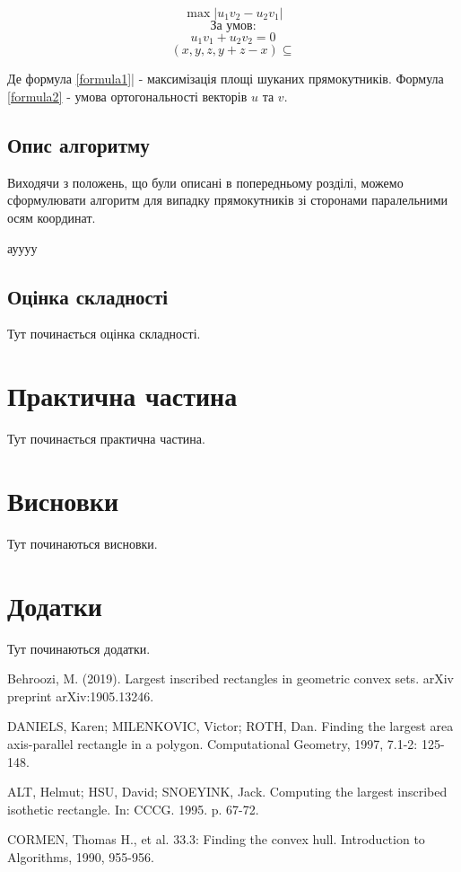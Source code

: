 \documentclass[a4paper,12pt]{article}
\begin{document}
	\begin{equation}
		\max \left| u_1 v_2 - u_2 v_1 \right|
		\label{formula1}
	\end{equation}
	\[
	\text{За умов:}
	\]
	\begin{equation}
		u_1 v_1 + u_2 v_2 = 0
		\label{formula2}
	\end{equation}
	\begin{equation*}
		(x, y, z, y+z-x) \subseteq 
	\end{equation*}
	
	Де формула \ref{formula1}| - максимізація площі шуканих прямокутників. Формула \ref{formula2} - умова ортогональності векторів $u$ та $v$.
	
	\subsection{Опис алгоритму}
	Виходячи з положень, що були описані в попередньому розділі, можемо сформулювати алгоритм для випадку прямокутників зі сторонами паралельними осям координат.

	ауууу


	\subsection{Оцінка складності}
	Тут починається оцінка складності.
	\newpage
	
	\section{Практична частина}
	Тут починається практична частина.
	\newpage
	
	\section{Висновки}
	Тут починаються висновки.
	\newpage
	
	\section{Додатки}
	Тут починаються додатки.
	\newpage
	
	\begin{thebibliography}{9}
		Behroozi, M. (2019). Largest inscribed rectangles in geometric convex sets. arXiv preprint arXiv:1905.13246.
		
		DANIELS, Karen; MILENKOVIC, Victor; ROTH, Dan. Finding the largest area axis-parallel rectangle in a polygon. Computational Geometry, 1997, 7.1-2: 125-148.
		
		
		ALT, Helmut; HSU, David; SNOEYINK, Jack. Computing the largest inscribed isothetic rectangle. In: CCCG. 1995. p. 67-72.
		
		
		CORMEN, Thomas H., et al. 33.3: Finding the convex hull. Introduction to Algorithms, 1990, 955-956.
	\end{thebibliography}
	
\end{document}
